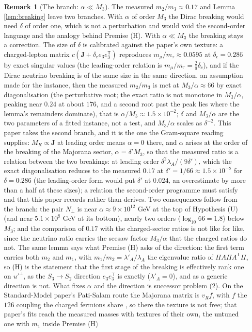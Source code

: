 \documentclass[11pt]{article}
\theoremstyle{definition}
\newtheorem{remark}[theorem]{Remark}
\newcommand{\J}{\mathbf{J}}
\begin{document}
\begin{remark}[The branch: $\alpha \ll M_{3}$]\label{rem:branch}
The measured $m_{2}/m_{3} \approx 0.17$ and Lemma \ref{lem:breaking} leave two branches. With $\alpha$ of order $M_{3}$ the Dirac breaking would need $\delta$ of order one, which is not a perturbation and would void the second-order language and the analogy behind Premise (H). With $\alpha \ll M_{3}$ the breaking stays a correction. The size of $\delta$ is calibrated against the paper's own texture: a charged-lepton matrix $c(\J + \delta_{c}e_{3}e_{3}^{\mathsf{T}})$ reproduces $m_{\mu}/m_{\tau} \approx 0.0595$ \cite{PDG2024} at $\delta_{c} = 0.286$ by exact singular values (the leading-order relation is $m_{\mu}/m_{\tau} = \tfrac29\delta_{c}$), and if the Dirac neutrino breaking is of the same size in the same direction, an assumption made for the instance, then the measured $m_{2}/m_{3}$ is met at $M_{3}/\alpha \approx 66$ by exact diagonalisation (the perturbative root; the exact ratio is not monotone in $M_{3}/\alpha$, peaking near $0.24$ at about $176$, and a second root past the peak lies where the lemma's remainders dominate), that is $\alpha/M_{3} \approx 1.5 \times 10^{-2}$; $\delta$ and $M_{3}/\alpha$ are the two parameters of a fitted instance, not a test, and $M_{3}/\alpha$ scales as $\delta^{-2}$. This paper takes the second branch, and it is the one the Gram-square reading supplies: $M_{R} \propto \J$ at leading order means $\alpha = 0$ there, and $\alpha$ arises at the order of the breaking of the Majorana sector, $\alpha = \delta' M_{3}$, so that the measured ratio is a relation between the two breakings: at leading order $\delta^{2}\lambda_{A}/(9\delta')$, which the exact diagonalisation reduces to the measured $0.17$ at $\delta' = 1/66 \approx 1.5 \times 10^{-2}$ for $\delta = 0.286$ (the leading-order form would put $\delta'$ at $0.024$, an overestimate by more than a half at these sizes); a relation the second-order programme must satisfy and that this paper records rather than derives. Two consequences follow from the branch: the pair $N_{\perp}$ is near $\alpha \approx 9 \times 10^{12}$ GeV at the top of Hypothesis (U) (and near $5.1 \times 10^{9}$ GeV at its bottom), nearly two orders ($\log_{10}66 = 1.8$) below $M_{3}$; and the comparison of $0.17$ with the charged-sector ratios is not like for like, since the neutrino ratio carries the seesaw factor $M_{3}/\alpha$ that the charged ratios do not. The same lemma says what Premise (H) asks of the direction: the first term carries both $m_{2}$ and $m_{1}$, with $m_{1}/m_{2} = \lambda'_{A}/\lambda_{A}$ the eigenvalue ratio of $\Pi A\Pi A^{\mathsf{T}}\Pi$, so (H) is the statement that the first stage of the breaking is effectively rank one on $u'^{\perp}$, as the $S_{3} \to S_{2}$ direction $e_{3}e_{3}^{\mathsf{T}}$ is exactly ($\lambda'_{A} = 0$), and as a generic direction is not. What fixes $\alpha$ and the direction is successor problem (2). On the Standard-Model paper's Pati-Salam route the Majorana matrix is $v_{R}f$, with $f$ the $126$ coupling the charged fermions share \cite[Fact~11.1, Prop.~11.5]{ButlerT12}, so there the texture is not free; that paper's fits reach the measured masses with textures of their own, the untuned one with $m_{1}$ inside Premise (H) 
\end{remark}
\end{document}
